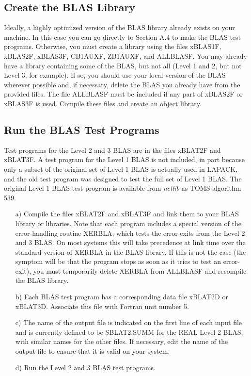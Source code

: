 \subsection{Create the BLAS Library} 
\dent
Ideally, a highly optimized version of the BLAS library already
exists on your machine. 
In this case you can go directly to Section A.4 to
make the BLAS test programs.  
Otherwise, you must create a library using the files
xBLAS1F,  xBLAS2F,  xBLAS3F, CB1AUXF, ZB1AUXF, and ALLBLASF.
You may already have a library containing some of the BLAS,
but not all (Level 1 and 2, but not Level 3, for example). 
If so, you should use your local version of the BLAS wherever
possible and, if necessary, delete the BLAS you
already have from the provided files. 
The file ALLBLASF must be included if any part of xBLAS2F or xBLAS3F
is used.  
Compile these files and create an object library.

\subsection{Run the BLAS Test Programs}

\dent
Test programs for the Level 2 and 3 BLAS are in the files
xBLAT2F and xBLAT3F. 
A test program for the Level 1 BLAS is not
included, in part because only a subset of the original set
of Level 1 BLAS is actually used in LAPACK, and the old 
test program was designed to test the full set of Level 1 BLAS. 
The original Level 1 BLAS test program is available from {\em netlib}
as TOMS algorithm 539.

\begin{itemize}
\item[a)]
Compile the files xBLAT2F and xBLAT3F and link them to your BLAS library or
libraries.
Note that each program includes a special version of the error-handling routine
XERBLA, which tests the error-exits from the Level 2 and 3 BLAS. On most
systems this will take precedence at link time over the standard version of
XERBLA in the BLAS library. If this is not the case (the symptom will be that
the program stops as soon as it tries to test an error-exit), you must
temporarily delete XERBLA from ALLBLASF and recompile the BLAS library.

\item[b)]
Each BLAS test program has a corresponding data file xBLAT2D or xBLAT3D.
Associate this file with Fortran unit number 5.

\item[c)]
The name of the output file is indicated on the first line of each
input file and is currently defined to be SBLAT2.SUMM for the
REAL Level 2 BLAS,
with similar names for the other files. 
If necessary, edit the name of
the output file to ensure that it is valid on your system.

\item[d)]
Run the Level 2 and 3 BLAS test programs.
\end{itemize}

